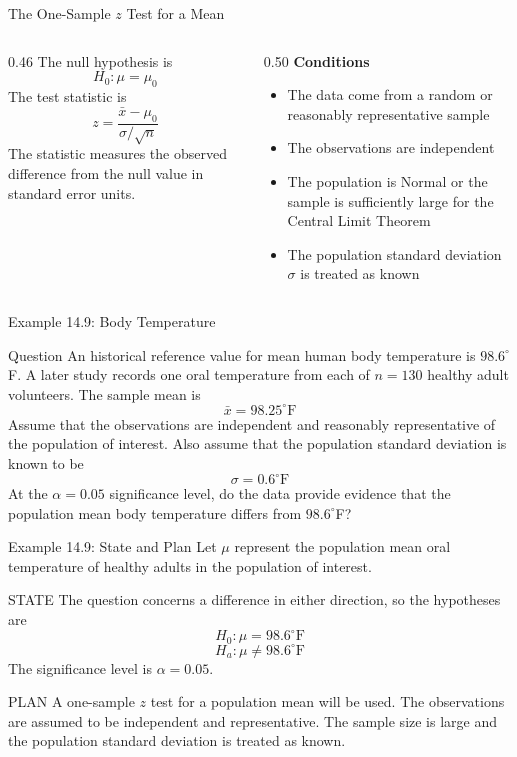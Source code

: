 \documentclass[aspectratio=169]{beamer}
\begin{document}
\begin{frame}{The One-Sample $z$ Test for a Mean}
\begin{columns}[T,onlytextwidth]
\begin{column}{0.46\textwidth}
The null hypothesis is
$$H_0:\mu=\mu_0$$
The test statistic is
$$z=\frac{\bar{x}-\mu_0}{\sigma/\sqrt{n}}$$
The statistic measures the observed difference from the null value in standard error units.
\end{column}

\begin{column}{0.50\textwidth}
\textbf{Conditions}
\begin{itemize}
	\item The data come from a random or reasonably representative sample
	\item The observations are independent
	\item The population is Normal or the sample is sufficiently large for the Central Limit Theorem
	\item The population standard deviation $\sigma$ is treated as known
\end{itemize}
\end{column}
\end{columns}
\end{frame}

\begin{frame}{Example 14.9: Body Temperature}
\begin{block}{Question}
An historical reference value for mean human body temperature is $98.6^\circ$F. A later study records one oral temperature from each of $n=130$ healthy adult volunteers. The sample mean is
$$\bar{x}=98.25^\circ\text{F}$$
Assume that the observations are independent and reasonably representative of the population of interest. Also assume that the population standard deviation is known to be
$$\sigma=0.6^\circ\text{F}$$
At the $\alpha=0.05$ significance level, do the data provide evidence that the population mean body temperature differs from $98.6^\circ$F?
\end{block}
\end{frame}

\begin{frame}{Example 14.9: State and Plan}
Let $\mu$ represent the population mean oral temperature of healthy adults in the population of interest.
\vspace{0.15cm}
\begin{block}{STATE}
The question concerns a difference in either direction, so the hypotheses are
$$H_0:\mu=98.6^\circ\text{F}$$
$$H_a:\mu\ne98.6^\circ\text{F}$$
The significance level is $\alpha=0.05$.
\end{block}
\begin{block}{PLAN}
A one-sample $z$ test for a population mean will be used.
The observations are assumed to be independent and representative. The sample size is large and the population standard deviation is treated as known.
\end{block}
\end{frame}
\end{document}
